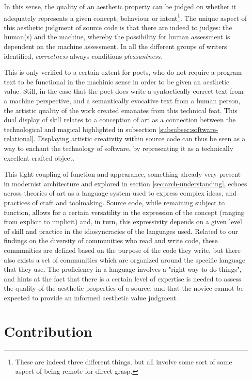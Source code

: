 In this sense, the quality of an aesthetic property can be judged on whether it adequately represents a given concept, behaviour or intent\footnote{These are indeed three different things, but all involve some sort of some aspect of being remote for direct grasp.}. The unique aspect of this aesthetic judgment of source code is that there are indeed to judges: the human(s) and the machine, whereby the possibility for human assessment is dependent on the machine assessment. In all the different groups of writers identified, \emph{correctness} always conditions \emph{pleasantness}.

This is only verified to a certain extent for poets, who do not require a program text to be functional in the machinic sense in order to be given an aesthetic value. Still, in the case that the poet does write a syntactically correct text from a machine perspective, and a semantically evocative text from a human person, the artistic quality of the work created emanates from this technical feat. This dual display of skill relates to a conception of art as a connection between the technological and magical highlighted in subsection \ref{subsubsec:software-relational}. Displaying artistic creativity within source code can thus be seen as a way to enchant the technology of software, by representing it as a technically excellent crafted object.

This tight coupling of function and appearance, something already very present in modernist architecture and explored in section \ref{sec:arch-understanding}, echoes across theories of art as a language system used to express complex ideas, and practices of craft and toolmaking. Source code, while remaining subject to function, allows for a certain versatility in the expression of the concept (ranging from explicit to implicit) and, in turn, this expressivity depends on a given level of skill and practice in the idiosyncracies of the languages used. Related to our findings on the diversity of communities who read and write code, these communities are defined based on the purpose of the code they write, but there also exists a set of communities which are organized around the specific language that they use. The proficiency in a language involves a "right way to do things", and hints at the fact that there is a certain level of expertise is needed to assess the quality of the aesthetic properties of a source, and that the novice cannot be expected to provide an informed aesthetic value judgment.

\section{Contribution}
\label{sec:conclusion-contribution}

